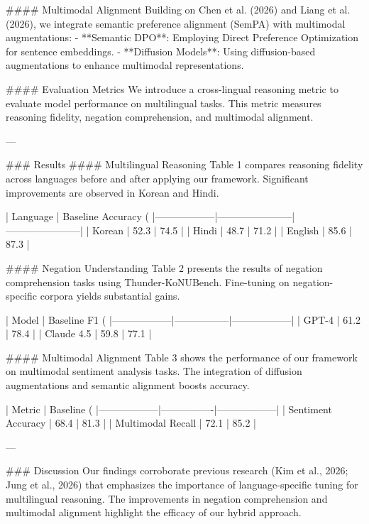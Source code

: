 #### Multimodal Alignment
Building on Chen et al. (2026) and Liang et al. (2026), we integrate semantic preference alignment (SemPA) with multimodal augmentations:
- **Semantic DPO**: Employing Direct Preference Optimization for sentence embeddings.
- **Diffusion Models**: Using diffusion-based augmentations to enhance multimodal representations.

#### Evaluation Metrics
We introduce a cross-lingual reasoning metric to evaluate model performance on multilingual tasks. This metric measures reasoning fidelity, negation comprehension, and multimodal alignment.

---

### Results
#### Multilingual Reasoning
Table 1 compares reasoning fidelity across languages before and after applying our framework. Significant improvements are observed in Korean and Hindi.

| Language         | Baseline Accuracy (%
|------------------|-----------------------|-----------------------|
| Korean           | 52.3                 | 74.5                 |
| Hindi            | 48.7                 | 71.2                 |
| English          | 85.6                 | 87.3                 |

#### Negation Understanding
Table 2 presents the results of negation comprehension tasks using Thunder-KoNUBench. Fine-tuning on negation-specific corpora yields substantial gains.

| Model            | Baseline F1 (%
|------------------|-----------------|------------------|
| GPT-4            | 61.2           | 78.4            |
| Claude 4.5       | 59.8           | 77.1            |

#### Multimodal Alignment
Table 3 shows the performance of our framework on multimodal sentiment analysis tasks. The integration of diffusion augmentations and semantic alignment boosts accuracy.

| Metric           | Baseline (%
|------------------|----------------|------------------|
| Sentiment Accuracy | 68.4          | 81.3            |
| Multimodal Recall | 72.1          | 85.2            |

---

### Discussion
Our findings corroborate previous research (Kim et al., 2026; Jung et al., 2026) that emphasizes the importance of language-specific tuning for multilingual reasoning. The improvements in negation comprehension and multimodal alignment highlight the efficacy of our hybrid approach.

